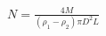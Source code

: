 \documentclass[preview]{standalone}
\begin{document}
\begin{align*}
N = \tfrac{4M}{(\rho_1 - \rho_2)\pi D^2 L}
\end{align*}
\end{document}
